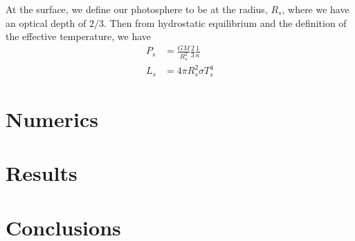 \documentclass[onecolumn]{article}
\begin{document}
At the surface, we define our photosphere to be at the radius, $R_s$, where we have an optical depth of $2 / 3$.  Then from hydrostatic equilibrium and the definition of the effective temperature, we have
\begin{align}
  P_s &= \frac{GM}{R_s^2}\frac{2}{3}\frac{1}{\kappa} \\
  L_s &= 4\pi R_s^2 \sigma T_s^4 \nonumber
\end{align}

\section{Numerics}

\section{Results}

\section{Conclusions}
\end{document}
